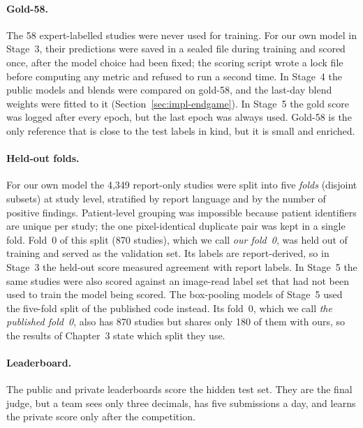 \paragraph{Gold-58.} The 58 expert-labelled studies were never used for training. For our own model in Stage~3, their predictions were saved in a sealed file during training and scored once, after the model choice had been fixed; the scoring script wrote a lock file before computing any metric and refused to run a second time. In Stage~4 the public models and blends were compared on gold-58, and the last-day blend weights were fitted to it (Section~\ref{sec:impl-endgame}). In Stage~5 the gold score was logged after every epoch, but the last epoch was always used. Gold-58 is the only reference that is close to the test labels in kind, but it is small and enriched.

\paragraph{Held-out folds.} For our own model the 4,349 report-only studies were split into five \emph{folds} (disjoint subsets) at study level, stratified by report language and by the number of positive findings. Patient-level grouping was impossible because patient identifiers are unique per study; the one pixel-identical duplicate pair was kept in a single fold. Fold~0 of this split (870 studies), which we call \emph{our fold~0}, was held out of training and served as the validation set. Its labels are report-derived, so in Stage~3 the held-out score measured agreement with report labels. In Stage~5 the same studies were also scored against an image-read label set that had not been used to train the model being scored. The box-pooling models of Stage~5 used the five-fold split of the published code instead. Its fold~0, which we call \emph{the published fold~0}, also has 870 studies but shares only 180 of them with ours, so the results of Chapter~3 state which split they use.

\paragraph{Leaderboard.} The public and private leaderboards score the hidden test set. They are the final judge, but a team sees only three decimals, has five submissions a day, and learns the private score only after the competition.

